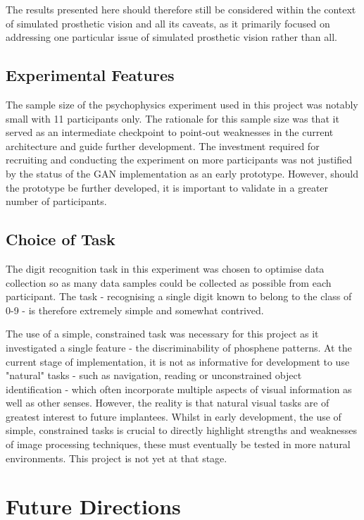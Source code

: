 \documentclass[a4paper,11pt,openany]{book}
\begin{document}
The results presented here should therefore still be considered within the context of simulated prosthetic vision and all its caveats, as it primarily focused on addressing one particular issue of simulated prosthetic vision rather than all.

\section*{Experimental Features}
\label{sec:org8b00412}

The sample size of the psychophysics experiment used in this project was notably small with 11 participants only.
The rationale for this sample size was that it served as an intermediate checkpoint to point-out weaknesses in the current architecture and guide further development.
The investment required for recruiting and conducting the experiment on more participants was not justified by the status of the GAN implementation as an early prototype.
However, should the prototype be further developed, it is important to validate in a greater number of participants.

\section*{Choice of Task}
\label{sec:org11605df}

The digit recognition task in this experiment was chosen to optimise data collection so as many data samples could be collected as possible from each participant.
The task - recognising a single digit known to belong to the class of 0-9 - is therefore extremely simple and somewhat contrived.

The use of a simple, constrained task was necessary for this project as it investigated a single feature - the discriminability of phosphene patterns.
At the current stage of implementation, it is not as informative for development to use "natural" tasks - such as navigation, reading or unconstrained object identification - which often incorporate multiple aspects of visual information as well as other senses.
However, the reality is that natural visual tasks are of greatest interest to future implantees.
Whilst in early development, the use of simple, constrained tasks is crucial to directly highlight strengths and weaknesses of image processing techniques, these must eventually be tested in more natural environments.
This project is not yet at that stage.

\chapter{Future Directions}
\label{sec:orga42134b}
\end{document}
